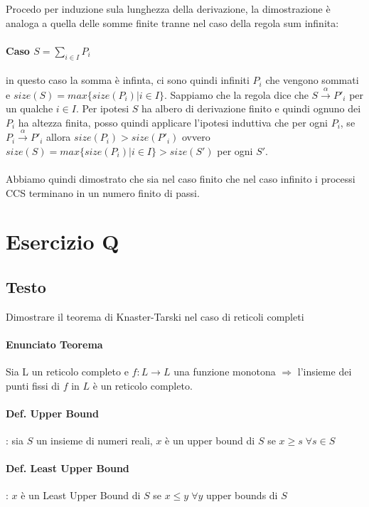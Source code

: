 \documentclass{article}
\newcommand{\passo}{\xrightarrow{\alpha}}
\begin{document}
Procedo per induzione sula lunghezza della derivazione, la dimostrazione è analoga a quella delle somme finite tranne nel caso della regola sum infinita:


\paragraph{Caso $S= \sum_{i \in I}P_{i}$}
in questo caso la somma è infinta, ci sono quindi infiniti $P_{i}$ che vengono sommati e $size(S) = max\{size(P_{i})| i \in I\}$. Sappiamo che la regola dice che $S \passo P'_{i}$ per un qualche $i \in I$.  Per ipotesi $S$ ha albero di derivazione finito  e quindi ognuno dei $P_{i}$ ha altezza finita, posso quindi applicare l'ipotesi induttiva che per ogni  $P_{i}$, se $ P_{i}\passo P'_{i}$ allora $size(P_{i}) > size(P'_{i})$  ovvero  $size(S) = max\{size(P_{i})| i \in I\} > size(S')$ per ogni $S'$.\\\\
Abbiamo quindi dimostrato che sia nel caso finito che nel caso infinito i processi CCS terminano in un numero finito di passi.

\section{Esercizio Q}
\subsection{Testo}
Dimostrare il teorema di Knaster-Tarski nel caso di reticoli completi


\paragraph{Enunciato Teorema}

Sia L un reticolo completo e $f:L \to L$ una funzione monotona $\Rightarrow$ l'insieme dei punti fissi di $f$ in $L$ è un reticolo completo.

\paragraph{Def. Upper Bound}: sia $S$ un insieme di numeri reali, $x$ è un upper bound di $S$ se $x \geq s \;\forall s \in S$ 

\paragraph{Def. Least Upper Bound}: $x$ è un Least Upper Bound di $S$ se $x \leq y \; \forall y $ upper bounds di $S$
\end{document}
